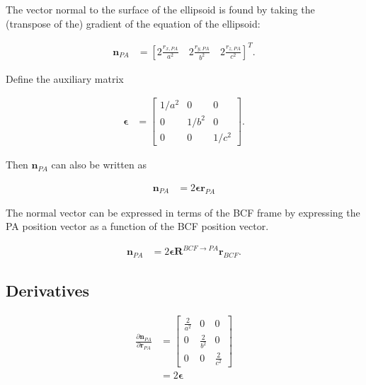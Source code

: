 \documentclass[]{article}
\newcommand{\vb}[1]{\bm{#1}} %
\newcommand{\pd}[2]{\frac{\partial #1}{\partial #2}} %
\begin{document}
\noindent The vector normal to the surface of the ellipsoid is found by taking the (transpose of the) gradient of the equation of the ellipsoid:

\begin{align}
	\vb{n}_{PA} &= \left[ 2 \frac{r_{x, PA}}{a^2} \quad 2 \frac{r_{y, PA}}{b^2} \quad 2 \frac{r_{z, PA}}{c^2} \right]^T.
\end{align}

Define the auxiliary matrix

\begin{align}
	\vb{\epsilon} &= \left[ \begin{array}{ccc}
	1/a^2 & 0 & 0 \\
	0 & 1/b^2 & 0 \\
	0 & 0 & 1/c^2 \end{array} \right].
\end{align}

Then $\vb{n}_{PA}$ can also be written as

\begin{align}
\vb{n}_{PA} &= 2 \vb{\epsilon} \vb{r}_{PA}
\end{align}

The normal vector can be expressed in terms of the BCF frame by expressing the PA position vector as a function of the BCF position vector.

\begin{align}
	\label{eq:npa_as_f_of_rbcf}
	\vb{n}_{PA} &= 2 \vb{\epsilon} \vb{R}^{BCF \rightarrow PA} \vb{r}_{BCF}.
\end{align}

\subsection{Derivatives}
\label{sec:ellipsoid_derivatives}

\begin{align}
	\label{eq:dnpa_drpa}
	\pd{\vb{n}_{PA}}{\vb{r}_{PA}} &= \left[ \begin{array}{ccc}
	\frac{2}{a^2} & 0 & 0 \\
	0 & \frac{2}{b^2} & 0 \\
	0 & 0 & \frac{2}{c^2} \end{array} \right] \\
	&= 2 \vb{\epsilon}
\end{align}
\end{document}
